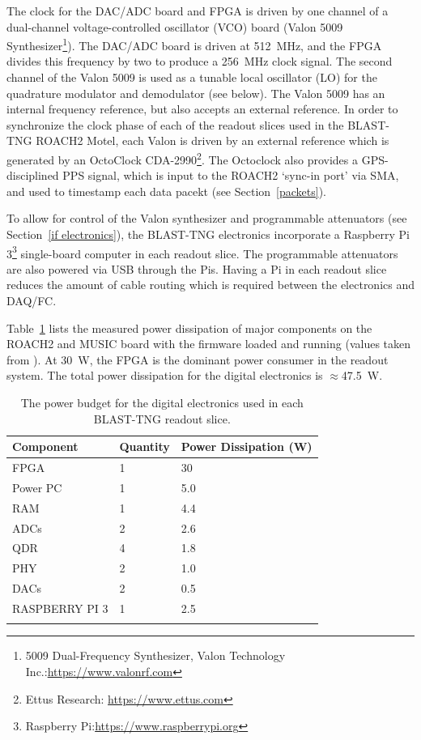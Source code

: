 The clock for the DAC/ADC board and FPGA is driven by one channel of a dual-channel voltage-controlled oscillator (VCO) board (Valon 5009 Synthesizer\footnote{5009 Dual-Frequency Synthesizer, Valon Technology Inc.:\url{https://www.valonrf.com}}). The DAC/ADC board is driven at 512~MHz, and the FPGA divides this frequency by two to produce a 256~MHz clock signal. The second channel of the Valon 5009 is used as a tunable local oscillator (LO) for the quadrature modulator and demodulator (see below). The Valon 5009 has an internal frequency reference, but also accepts an external reference. In order to synchronize the clock phase of each of the readout slices used in the BLAST-TNG ROACH2 Motel, each Valon is driven by an external reference which is generated by an
OctoClock CDA-2990\footnote{Ettus Research: \url{https://www.ettus.com}}. The Octoclock also provides a GPS-disciplined PPS signal, which is input to the ROACH2 `sync-in port' via SMA, and used to timestamp each data pacekt (see Section~\ref{packets}).

To allow for control of the Valon synthesizer and programmable attenuators (see Section~\ref{if electronics}), the BLAST-TNG electronics incorporate a Raspberry Pi 3\footnote{Raspberry Pi:\url{https://www.raspberrypi.org}} single-board computer in each readout slice. The programmable attenuators are also powered via USB through the Pis. Having a Pi in each readout slice reduces the amount of cable routing which is required between the electronics and DAQ/FC\@.

Table~\ref{tab:dig power budget} lists the measured power dissipation of major components on the ROACH2 and MUSIC board with the firmware loaded and running (values taken from \citet{gordon2016}). At 30~W, the FPGA is the dominant power consumer in the readout system. The total power dissipation for the digital electronics is $\approx$47.5~W.

\begin{table}[!htbp]
\centering
\begin{tabular}{@{}lll@{}}
\dtoprule{}
Component & Quantity & Power Dissipation (W) \\ \midrule
FPGA & 1 & 30 \\
Power PC & 1 & 5.0 \\
RAM & 1 & 4.4 \\
ADCs & 2 & 2.6 \\
QDR & 4 & 1.8 \\
PHY & 2 & 1.0 \\
DACs & 2 & 0.5 \\
RASPBERRY PI 3 & 1 & 2.5 \\ \dbottomrule{}
\\
\end{tabular}
\caption[~The power budget for the digital electronics used in each BLAST-TNG readout slice.]{The power budget for the digital electronics used in each BLAST-TNG readout slice.}
\label{tab:dig power budget}
\end{table}

